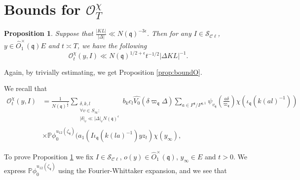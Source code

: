 \documentclass[a4paper,11pt]{amsart}
\newtheorem{proposition}[theorem]{Proposition}
\theoremstyle{definition}
\newcommand{\cl}{\mathcal{C}\ell}
\begin{document}
\section{Bounds for $\mathcal{O}_T^\chi$}\label{sec:Bounds for OT}
\begin{proposition}\label{prop:boundot} Suppose that $\frac{\vert{KL}\vert}{\vert\Delta\vert} \ll N(\mathfrak{q})^{-3\epsilon}$. Then for any $I\in \mathcal{S}_{\cl}$, $y \in \widehat{O}_1^{\times}(\mathfrak{q})E$ and $t\asymp T$, we have the following \[\mathcal{O}_t^{\chi}(y,I)\ll N(\mathfrak{q})^{1/2+\epsilon}t^{-1/2}\vert\Delta KL\vert^{-1}.  \]
\end{proposition}
Again, by trivially estimating, we get Proposition \ref{prop:boundO}.

We recall that
\begin{align*}
    \mathcal{O}^{\chi}_t(y,I)&=\frac{1}{N(\mathfrak{q})^{\frac{1}{2}}}\sum_{\substack{\delta,k,l\\ \forall v \in S_{\infty}:\\\vert{\delta}\vert_v \ll \vert{\Delta}\vert_vN(\mathfrak{q})^{\epsilon}}}b_kc_l\widehat{V_0}\left(\delta\varpi_\mathfrak{q}\Delta\right)\sum_{a\in F^{\mathfrak{q}}/F^{\mathfrak{q,1}}}\psi_{v_{\mathfrak{q}}}\left(\frac{a\delta}{\varpi_{\mathfrak{q}}}\right)\chi(\iota_{\mathfrak{q}}(k(al)^{-1}))\nonumber\\
    &\times \mathbb{P}\phi_0^{u_{12}(\zeta_{\mathfrak{q}})}(a_1(I\iota_{\mathfrak{q}}(k(la)^{-1})yz_t)\chi(y_{\infty}), 
\end{align*}

To prove Proposition \ref{prop:boundot} we fix $I\in \mathcal{S}_{\cl}$, $o(y) \in \widehat{O}_1^{\times}(\mathfrak{q})$, $y_{\infty} \in E$ and $t>0$. 
We express $\mathbb{P}\phi_0^{u_{12}(\zeta_{\mathfrak{q}})}$ using the Fourier-Whittaker expansion, and we see that 
\end{document}
